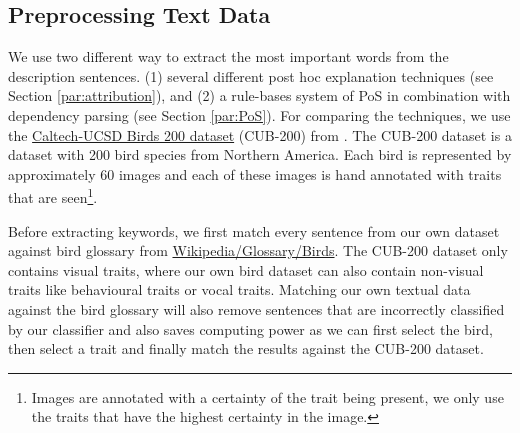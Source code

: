 \documentclass[a4paper, 12pt, oneside]{book} %
\begin{document}

\subsection{Preprocessing Text Data} \label{par:keywords}
We use two different way to extract the most important words from the description sentences.
(1) several different post hoc explanation techniques (see Section \ref{par:attribution}), and (2) a rule-bases system of PoS in combination with dependency parsing (see Section \ref{par:PoS}). 
For comparing the techniques, we use the \href{http://www.vision.caltech.edu/visipedia/CUB-200-2011.html}{Caltech-UCSD Birds 200 dataset} (CUB-200) from  \textcite{welinder_caltech-ucsd_2010}.
The CUB-200 dataset is a dataset with 200 bird species from Northern America.
Each bird is represented by approximately 60 images and each of these images is hand annotated with traits that are seen\footnote{Images are annotated with a certainty of the trait being present, we only use the traits that have the highest certainty in the image.}.

Before extracting keywords, we first match every sentence from our own dataset against bird glossary from \href{https://en.wikipedia.org/wiki/Glossary_of_bird_terms}{Wikipedia/Glossary/Birds}.
The CUB-200 dataset only contains visual traits, where our own bird dataset can also contain non-visual traits like behavioural traits or vocal traits.
Matching our own textual data against the bird glossary will also remove sentences that are incorrectly classified by our classifier and also saves computing power as we can first select the bird, then select a trait and finally match the results against the CUB-200 dataset.
\end{document}
